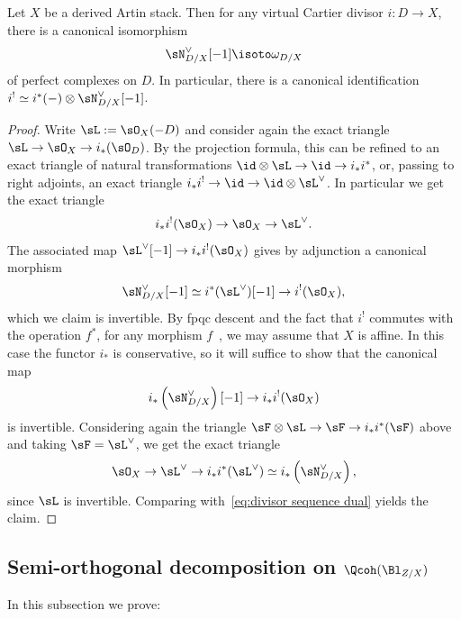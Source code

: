 \begin{prop}\label{prop:omega_D/X}
Let $X$ be a derived Artin stack. Then for any virtual Cartier divisor $i : D \to X$, there is a canonical isomorphism
\[
\sN_{D/X}^\vee[-1] \isoto \omega_{D/X}
\]
of perfect complexes on $D$. In particular, there is a canonical identification\linebreak$i^! \simeq i^*(-) \otimes \sN_{D/X}^\vee[-1]$.
\end{prop}

\begin{proof}
Write $\sL := \sO_X(-D)$ and consider again the exact triangle $\sL \to \sO_X \to i_*(\sO_D)$. By the projection formula, this can be refined to an exact triangle of natural transformations $\id\otimes\sL \to \id \to i_*i^*$, or, passing to right adjoints, an exact triangle $i_*i^! \to \id \to \id \otimes \sL^\vee$. In particular we get the exact triangle
\begin{equation}\label{eq:divisor sequence dual}
i_*i^!(\sO_X) \to \sO_X \to \sL^\vee.
\end{equation}
The associated map $\sL^\vee[-1] \to i_*i^!(\sO_X)$ gives by adjunction a canonical morphism
\[
\sN_{D/X}^\vee[-1] \simeq i^*(\sL^\vee)[-1] \to i^!(\sO_X),
\]
which we claim is invertible. By fpqc descent and the fact that $i^!$ commutes with the operation $f^*$, for any morphism $f$~\cite[Proposition~6.4.2.1]{SAG-20180204}, we may assume that $X$ is affine. In this case the functor $i_*$ is conservative, so it will suffice to show that the canonical map
\[
i_*\left(\sN_{D/X}^\vee\right)[-1] \to i_*i^!(\sO_X)
\]
is invertible. Considering again the triangle $\sF \otimes \sL \to \sF \to i_*i^*(\sF)$ above and taking $\sF = \sL^\vee$, we get the exact triangle
\begin{equation*}
\sO_X \to \sL^\vee \to i_*i^*(\sL^\vee) \simeq i_*\left(\sN_{D/X}^\vee\right),
\end{equation*}
since $\sL$ is invertible. Comparing with~\eqref{eq:divisor sequence dual} yields the claim.
\end{proof}

\subsection{Semi-orthogonal decomposition on \texorpdfstring{$\Qcoh(\Bl_{Z/X})$}{Qcoh(Bl)}}

In this subsection we prove:


